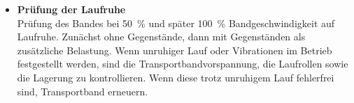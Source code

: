 \begin{itemize}
	
	\item \textbf{Prüfung der Laufruhe} \\
	Prüfung des Bandes bei 50 \% und später 100 \% Bandgeschwindigkeit auf Laufruhe. Zunächst ohne Gegenstände, dann mit Gegenständen als zusätzliche Belastung. Wenn unruhiger Lauf oder Vibrationen im Betrieb festgestellt werden, sind die Transportbandvorspannung, die Laufrollen sowie die Lagerung zu kontrollieren. Wenn diese trotz unruhigem Lauf fehlerfrei sind, Transportband erneuern.

	
\end{itemize}
